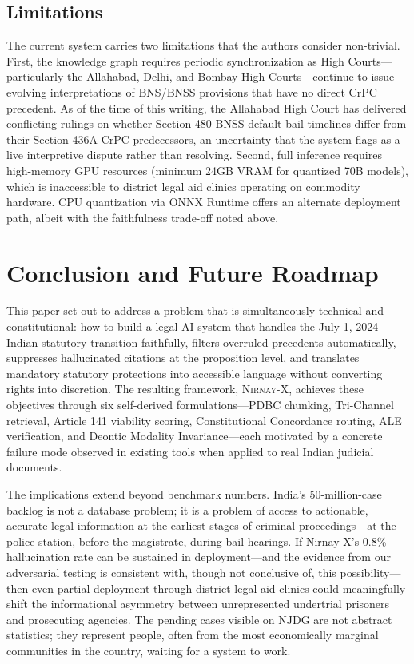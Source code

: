 \documentclass[conference]{IEEEtran}
\begin{document}
\subsection{Limitations}
The current system carries two limitations that the authors consider non-trivial. First, the knowledge graph requires periodic synchronization as High Courts---particularly the Allahabad, Delhi, and Bombay High Courts---continue to issue evolving interpretations of BNS/BNSS provisions that have no direct CrPC precedent. As of the time of this writing, the Allahabad High Court has delivered conflicting rulings on whether Section 480 BNSS default bail timelines differ from their Section 436A CrPC predecessors, an uncertainty that the system flags as a live interpretive dispute rather than resolving. Second, full inference requires high-memory GPU resources (minimum 24GB VRAM for quantized 70B models), which is inaccessible to district legal aid clinics operating on commodity hardware. CPU quantization via ONNX Runtime offers an alternate deployment path, albeit with the faithfulness trade-off noted above.

\section{Conclusion and Future Roadmap}
This paper set out to address a problem that is simultaneously technical and constitutional: how to build a legal AI system that handles the July 1, 2024 Indian statutory transition faithfully, filters overruled precedents automatically, suppresses hallucinated citations at the proposition level, and translates mandatory statutory protections into accessible language without converting rights into discretion. The resulting framework, \textsc{Nirnay-X}, achieves these objectives through six self-derived formulations---PDBC chunking, Tri-Channel retrieval, Article 141 viability scoring, Constitutional Concordance routing, ALE verification, and Deontic Modality Invariance---each motivated by a concrete failure mode observed in existing tools when applied to real Indian judicial documents.

The implications extend beyond benchmark numbers. India's 50-million-case backlog is not a database problem; it is a problem of access to actionable, accurate legal information at the earliest stages of criminal proceedings---at the police station, before the magistrate, during bail hearings. If Nirnay-X's 0.8\% hallucination rate can be sustained in deployment---and the evidence from our adversarial testing is consistent with, though not conclusive of, this possibility---then even partial deployment through district legal aid clinics could meaningfully shift the informational asymmetry between unrepresented undertrial prisoners and prosecuting agencies. The pending cases visible on NJDG are not abstract statistics; they represent people, often from the most economically marginal communities in the country, waiting for a system to work.
\end{document}
